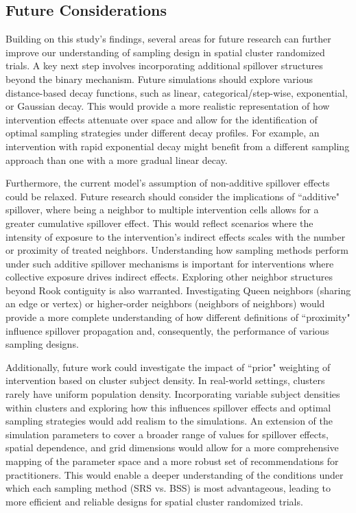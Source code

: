 \documentclass{article}[11pt]
\begin{document}
\subsection{Future Considerations}

Building on this study's findings, several areas for future research can further improve our
understanding of sampling design in spatial cluster randomized trials. A key next step involves incorporating additional spillover structures beyond the binary mechanism. Future simulations should explore various distance-based decay functions, such
as linear, categorical/step-wise, exponential, or Gaussian decay. This would provide a more
realistic representation of how intervention effects attenuate over space and allow for the
identification of optimal sampling strategies under different decay profiles. For example, an
intervention with rapid exponential decay might benefit from a different sampling approach
than one with a more gradual linear decay.

Furthermore, the current model's assumption of non-additive spillover effects could be
relaxed. Future research should consider the implications of ``additive" spillover, where
being a neighbor to multiple intervention cells allows for a greater cumulative spillover effect.
This would reflect scenarios where the intensity of exposure to the intervention's indirect
effects scales with the number or proximity of treated neighbors. Understanding how
sampling methods perform under such additive spillover mechanisms is important for
interventions where collective exposure drives indirect effects. Exploring other neighbor structures beyond Rook contiguity is also warranted. Investigating Queen neighbors (sharing an edge or vertex) or higher-order neighbors (neighbors of
neighbors) would provide a more complete understanding of how different definitions of
``proximity" influence spillover propagation and, consequently, the performance of various
sampling designs.

Additionally, future work could investigate the impact of ``prior" weighting of intervention
based on cluster subject density. In real-world settings, clusters rarely have uniform
population density. Incorporating variable subject densities within clusters and exploring how
this influences spillover effects and optimal sampling strategies would add realism to the
simulations. An extension of the simulation parameters to cover a broader range of values for spillover
effects, spatial dependence, and grid dimensions would allow for a more comprehensive mapping of the
parameter space and a more robust set of recommendations for practitioners. This would
enable a deeper understanding of the conditions under which each sampling method (SRS vs.
BSS) is most advantageous, leading to more efficient and reliable designs for spatial cluster
randomized trials.
\end{document}
